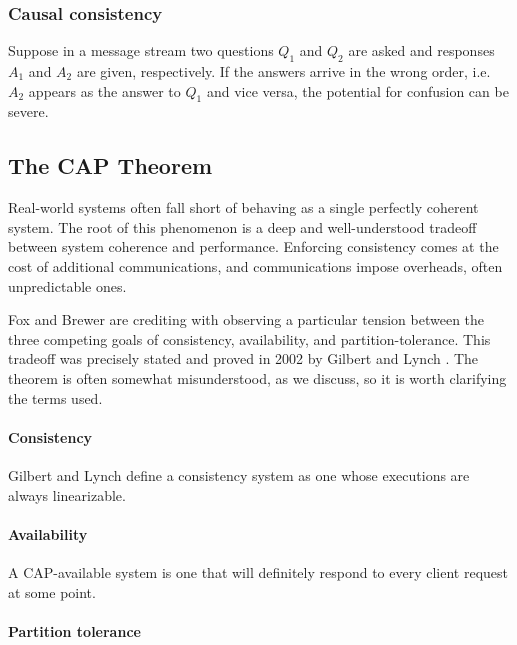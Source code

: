 \documentclass[]             %
{NASA}                       %
\theoremstyle{definition}
\begin{document}
\hypertarget{causal-consistency}{%
\subsubsection{Causal consistency}\label{causal-consistency}}

Suppose in a message stream two questions \(Q_1\) and \(Q_2\) are asked
and responses \(A_1\) and \(A_2\) are given, respectively. If the
answers arrive in the wrong order, i.e.~\(A_2\) appears as the answer to
\(Q_1\) and vice versa, the potential for confusion can be severe.

\hypertarget{the-cap-theorem}{%
\subsection{The CAP Theorem}\label{the-cap-theorem}}

Real-world systems often fall short of behaving as a single perfectly
coherent system. The root of this phenomenon is a deep and
well-understood tradeoff between system coherence and performance.
Enforcing consistency comes at the cost of additional communications,
and communications impose overheads, often unpredictable ones.

Fox and Brewer \cite{1999foxbrewer} are crediting with observing a
particular tension between the three competing goals of consistency,
availability, and partition-tolerance. This tradeoff was precisely
stated and proved in 2002 by Gilbert and Lynch
\cite{2002gilbertlynchCAP}.  The theorem is often somewhat
misunderstood, as we discuss, so it is worth clarifying the terms
used.

\paragraph{Consistency}

Gilbert and Lynch define a consistency system as one whose executions
are always linearizable.

\paragraph{Availability}

A CAP-available system is one that will definitely respond to every
client request at some point.

\paragraph{Partition tolerance}
\end{document}
